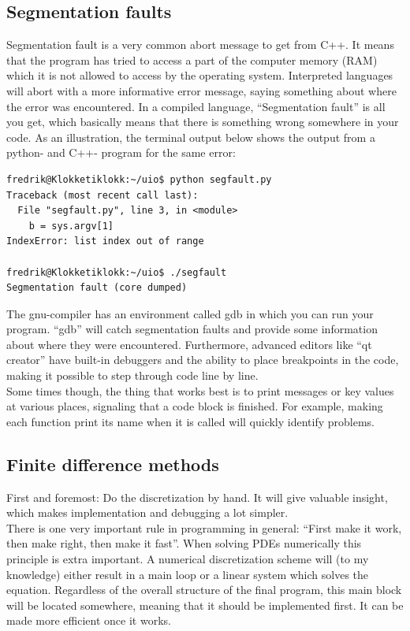 \subsection{Segmentation faults}
Segmentation fault is a very common abort message to get from C++. It means that the program has tried to access a part of the computer memory (RAM) which it is not allowed to access by the operating system. 
Interpreted languages will abort with a more informative error message, saying something about where the error was encountered. 
In a compiled language, ``Segmentation fault'' is all you get, which basically means that there is something wrong somewhere in your code. 
As an illustration, the terminal output below shows the output from a python- and C++- program for the same error:
\begin{lstlisting}
fredrik@Klokketiklokk:~/uio$ python segfault.py 
Traceback (most recent call last):
  File "segfault.py", line 3, in <module>
    b = sys.argv[1]
IndexError: list index out of range

fredrik@Klokketiklokk:~/uio$ ./segfault 
Segmentation fault (core dumped)
\end{lstlisting}

The gnu-compiler has an environment called gdb in which you can run your program. 
``gdb'' will catch segmentation faults and provide some information about where they were encountered. 
Furthermore, advanced editors like ``qt creator'' have built-in debuggers and the ability to place breakpoints in the code, making it possible to step through code line by line. \\
Some times though, the thing that works best is to print messages or key values at various places, signaling that a code block is finished. 
For example, making each function print its name when it is called will quickly identify problems. 

\subsection{Finite difference methods}
First and foremost: Do the discretization by hand. 
It will give valuable insight, which makes implementation and debugging a lot simpler. \\

\noindent There is one very important rule in programming in general: ``First make it work, then make right, then make it fast''. 
When solving PDEs numerically this principle is extra important. 
A numerical discretization scheme will (to my knowledge) either result in a main loop or a linear system which solves the equation. 
Regardless of the overall structure of the final program, this main block will be located somewhere, meaning that it should be implemented first. 
It can be made more efficient once it works. \\

